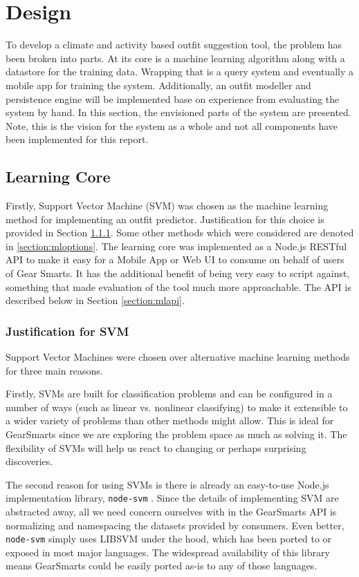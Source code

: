 \section{Design}
\label{section:design}
To develop a climate and activity based outfit suggestion tool, the problem has been broken into parts.
At its core is a machine learning algorithm along with a datastore for the training data. Wrapping that is
a query system and eventually a mobile app for training the system. Additionally, an outfit modeller and persistence
engine will be implemented base on experience from evaluating the system by hand.
In this section, the envisioned parts of the system are presented. Note, this is the vision for the system as a whole and
not all components have been implemented for this report.

\subsection{Learning Core}
Firstly, Support Vector Machine (SVM) \cite{SVM} was chosen as the machine learning method for implementing an outfit predictor.
Justification for this choice is provided in Section \ref{section:mlsvm}. Some other methods which were considered are
denoted in \ref{section:mloptions}. The learning core was implemented as a Node.js RESTful API to make it easy for a
Mobile App or Web UI to consume on behalf of users of Gear Smarts. It has the additional benefit of being very easy to
script against, something that made evaluation of the tool much more approachable.
The API is described below in Section \ref{section:mlapi}.

\subsubsection{Justification for SVM}
\label{section:mlsvm}
Support Vector Machines were chosen over alternative machine learning methods for three main reasons.

Firstly, SVMs are built for classification problems and can be configured in a number of ways (such as linear vs.
nonlinear classifying) to make it extensible to a wider variety of problems than other methods might allow. This is
ideal for GearSmarts since we are exploring the problem space as much as solving it. The flexibility of SVMs will
help us react to changing or perhaps surprising discoveries.

The second reason for using SVMs is there is already an easy-to-use Node.js implementation library, \texttt{node-svm}
\cite{Github:nodesvm}. Since the details of implementing SVM are abstracted away, all we need concern ourselves with in
the GearSmarts API is normalizing and namespacing the datasets provided by consumers. Even better, \texttt{node-svm}
simply uses LIBSVM \cite{lib:libsvm} under the hood, which has been ported to or exposed in most major languages. The
widespread availability of this library means GearSmarts could be easily ported as-is to any of those languages.

